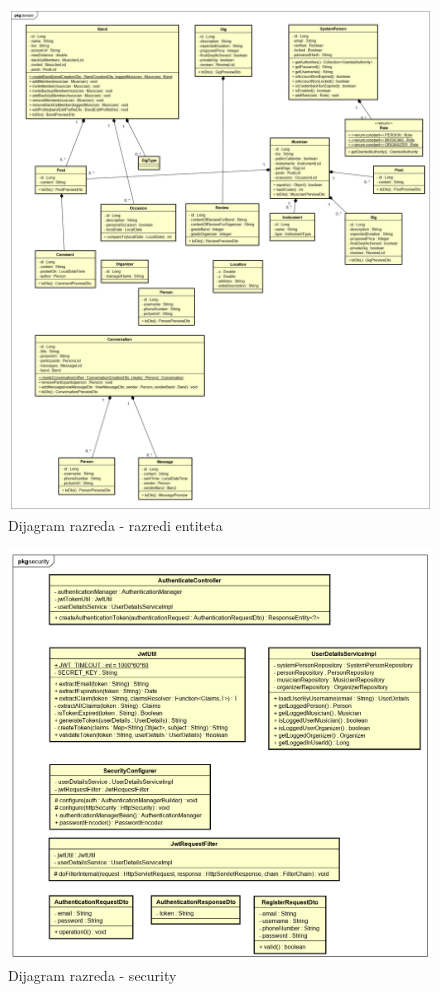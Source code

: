 		\begin{figure}[H]
			\begin{center}
				\includegraphics[width=17cm]{slike/domena.PNG}
			\end{center}
			\caption{Dijagram razreda - razredi entiteta}
			\label{fig:domena}
		\end{figure}

		\begin{figure}[H]
			\begin{center}
				\includegraphics[width=17cm]{slike/security.PNG}
			\end{center}
			\caption{Dijagram razreda - security}
			\label{fig:sec}
		\end{figure}
